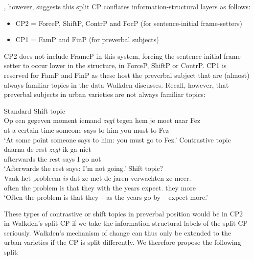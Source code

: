 \documentclass[output=paper]{langsci/langscibook}
\begin{document}
\textcite{Walkden:2017}, however, suggests this split CP conflates
information-struc\-tural layers as follows:

\begin{itemize}

    \item CP2 = ForceP, ShiftP, ContrP and FocP (for sentence-initial
        frame-setters)

    \item CP1 = FamP and FinP (for preverbal subjects)
\end{itemize}

\noindent CP2 does not include FrameP in this system, forcing the
sentence-initial frame-setter to occur lower in the structure, in ForceP,
ShiftP or ContrP. CP1 is reserved for FamP and FinP as these host the preverbal
subject that are (almost) always familiar topics in the data Walkden discusses.
Recall, however, that preverbal subjects in  urban varieties are not
always familiar topics:

\ea Standard 
    \ea Shift topic\\
    \gll\label{eexsbjnpc}Op een gegeven moment iemand \textit{zegt} tegen hem je moet naar Fez\\
    at a certain time someone says to him you must to Fez\\
    \trans \enquote*{At some point someone says to him: you must go to Fez.}
    \ex Contrastive topic\\
    \gll\label{eexsbjnpd}daarna de rest \textit{zegt} ik ga niet\\
    afterwards the rest says I go not\\
    \trans \enquote*{Afterwards the rest says: I'm not going.}
    \ex Shift topic?\\
    \gll\label{eexsbjnpe}Vaak het probleem \textit{is} dat ze met de jaren verwachten ze meer.\\
    often the problem is that they with the years expect.\Pl{} they more\\
    \trans \enquote*{Often the problem is that they -- as the years go by -- expect more.}
    \z
\z

\noindent These types of contrastive or shift topics in preverbal position
would be in CP2 in Walkden's split CP if we take the information-structural
labels of the split CP seriously. Walkden's mechanism of change can thus only be
extended to the  urban varieties if the CP is split differently. We
therefore propose the following split:
\end{document}
